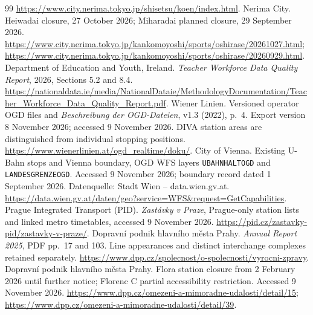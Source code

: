 \begin{thebibliography}{99}
\url{https://www.city.nerima.tokyo.jp/shisetsu/koen/index.html}.
 Nerima City. Heiwadai closure, 27 October 2026; Miharadai planned closure, 29 September 2026.
\url{https://www.city.nerima.tokyo.jp/kankomoyoshi/sports/oshirase/20261027.html};
\url{https://www.city.nerima.tokyo.jp/kankomoyoshi/sports/oshirase/20260929.html}.
 Department of Education and Youth, Ireland. \textit{Teacher Workforce Data Quality Report}, 2026, Sections 5.2 and 8.4.
\url{https://nationaldata.ie/media/NationalDataie/MethodologyDocumentation/Teacher_Workforce_Data_Quality_Report.pdf}.
 Wiener Linien. Versioned operator OGD files and
\textit{Beschreibung der OGD-Dateien}, v1.3 (2022), p.~4. Export version
8 November 2026; accessed 9 November 2026. DIVA station areas are distinguished
from individual stopping positions.
\url{https://www.wienerlinien.at/ogd_realtime/doku/}.
 City of Vienna. Existing U-Bahn stops and Vienna boundary,
OGD WFS layers \texttt{UBAHNHALTOGD} and \texttt{LANDESGRENZEOGD}.
Accessed 9 November 2026; boundary record dated 1 September 2026.
Datenquelle: Stadt Wien -- data.wien.gv.at.
\url{https://data.wien.gv.at/daten/geo?service=WFS&request=GetCapabilities}.
 Prague Integrated Transport (PID). \textit{Zast\'avky v Praze},
Prague-only station lists and linked metro timetables, accessed 9 November 2026.
\url{https://pid.cz/zastavky-pid/zastavky-v-praze/}.
 Dopravn\'i podnik hlavn\'iho m\v{e}sta Prahy.
\textit{Annual Report 2025}, PDF pp.~17 and 103. Line appearances and
distinct interchange complexes retained separately.
\url{https://www.dpp.cz/spolecnost/o-spolecnosti/vyrocni-zpravy}.
 Dopravn\'i podnik hlavn\'iho m\v{e}sta Prahy.
Flora station closure from 2 February 2026 until further notice; Florenc C
partial accessibility restriction. Accessed 9 November 2026.
\url{https://www.dpp.cz/omezeni-a-mimoradne-udalosti/detail/15};
\url{https://www.dpp.cz/omezeni-a-mimoradne-udalosti/detail/39}.
\end{thebibliography}
